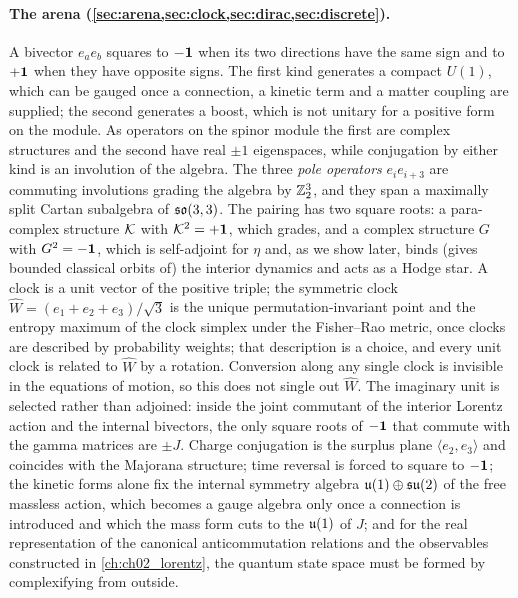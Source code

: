 \paragraph{The arena (\cref{sec:arena,sec:clock,sec:dirac,sec:discrete}).} A bivector $e_ae_b$ squares to $-\mathbf 1$ when its
two directions have the same sign and to $+\mathbf 1$ when they have opposite signs. The first kind generates a compact $U(1)$, which can be
gauged once a connection, a kinetic term and a matter coupling are supplied; the second generates a boost, which is not unitary for a positive
form on the module. As operators on the spinor module the first are complex structures and the second have real $\pm1$ eigenspaces, while
conjugation by either kind is an involution of the algebra. The three \emph{pole operators}
$e_ie_{i+3}$ are commuting involutions grading the algebra by $\mathbb{Z}_2^3$, and they span a maximally split Cartan
subalgebra of $\mathfrak{so}(3,3)$. The pairing has two square roots: a para-complex structure $\mathcal K$ with $\mathcal K^2=+\mathbf 1$, which grades,
and a complex structure $G$ with $G^2=-\mathbf 1$, which is self-adjoint for $\eta$ and, as we show later, binds (gives bounded classical orbits of) the interior
dynamics and acts as a Hodge star. A clock is a unit vector of the positive triple; the symmetric clock
$\widehat W=(e_1+e_2+e_3)/\sqrt3$ is the unique permutation-invariant point and the entropy maximum of the clock simplex
under the Fisher--Rao metric, once clocks are described by probability weights; that description is a choice, and every unit clock is
related to $\widehat W$ by a rotation. Conversion along any single clock is invisible in the equations of motion, so this does not
single out $\widehat W$.
The imaginary unit is selected rather than adjoined: inside the joint commutant of the interior Lorentz action and the
internal bivectors, the only square roots of $-\mathbf 1$ that commute with the gamma matrices are $\pm J$. Charge conjugation is
the surplus plane $\langle e_2,e_3\rangle$ and coincides with the Majorana structure; time reversal is forced to square to
$-\mathbf 1$; the kinetic forms alone fix the internal symmetry algebra $\mathfrak{u}(1)\oplus\mathfrak{su}(2)$ of the free massless action, which becomes a gauge
algebra only once a connection is introduced and which the mass form cuts to the $\mathfrak{u}(1)$ of $J$; and for the real representation of the
canonical anticommutation relations and the observables constructed in \cref{ch:ch02_lorentz}, the quantum state space must be formed by
complexifying from outside.

